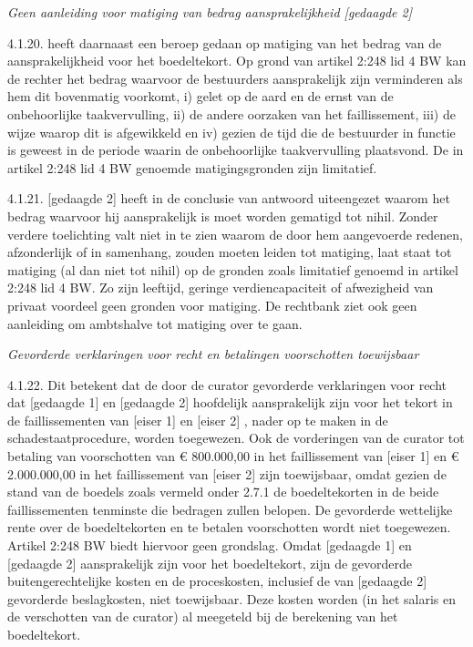 \documentclass[
  dutch,
  a4paper,
]{article}
\begin{document}
\emph{Geen aanleiding voor matiging van bedrag aansprakelijkheid {[}gedaagde 2{]}}

4.1.20. heeft daarnaast een beroep gedaan op matiging van het bedrag van de aansprakelijkheid voor het boedeltekort. Op grond van artikel 2:248 lid 4 BW kan de rechter het bedrag waarvoor de bestuurders aansprakelijk zijn verminderen als hem dit bovenmatig voorkomt, i) gelet op de aard en de ernst van de onbehoorlijke taakvervulling, ii) de andere oorzaken van het faillissement, iii) de wijze waarop dit is afgewikkeld en iv) gezien de tijd die de bestuurder in functie is geweest in de periode waarin de onbehoorlijke taakvervulling plaatsvond. De in artikel 2:248 lid 4 BW genoemde matigingsgronden zijn limitatief.

4.1.21. {[}gedaagde 2{]} heeft in de conclusie van antwoord uiteengezet waarom het bedrag waarvoor hij aansprakelijk is moet worden gematigd tot nihil. Zonder verdere toelichting valt niet in te zien waarom de door hem aangevoerde redenen, afzonderlijk of in samenhang, zouden moeten leiden tot matiging, laat staat tot matiging (al dan niet tot nihil) op de gronden zoals limitatief genoemd in artikel 2:248 lid 4 BW. Zo zijn leeftijd, geringe verdiencapaciteit of afwezigheid van privaat voordeel geen gronden voor matiging. De rechtbank ziet ook geen aanleiding om ambtshalve tot matiging over te gaan.

\emph{Gevorderde verklaringen voor recht en betalingen voorschotten toewijsbaar}

4.1.22. Dit betekent dat de door de curator gevorderde verklaringen voor recht dat {[}gedaagde 1{]} en {[}gedaagde 2{]} hoofdelijk aansprakelijk zijn voor het tekort in de faillissementen van {[}eiser 1{]} en {[}eiser 2{]} , nader op te maken in de schadestaatprocedure, worden toegewezen. Ook de vorderingen van de curator tot betaling van voorschotten van € 800.000,00 in het faillissement van {[}eiser 1{]} en € 2.000.000,00 in het faillissement van {[}eiser 2{]} zijn toewijsbaar, omdat gezien de stand van de boedels zoals vermeld onder 2.7.1 de boedeltekorten in de beide faillissementen tenminste die bedragen zullen belopen. De gevorderde wettelijke rente over de boedeltekorten en te betalen voorschotten wordt niet toegewezen. Artikel 2:248 BW biedt hiervoor geen grondslag. Omdat {[}gedaagde 1{]} en {[}gedaagde 2{]} aansprakelijk zijn voor het boedeltekort, zijn de gevorderde buitengerechtelijke kosten en de proceskosten, inclusief de van {[}gedaagde 2{]} gevorderde beslagkosten, niet toewijsbaar. Deze kosten worden (in het salaris en de verschotten van de curator) al meegeteld bij de berekening van het boedeltekort.
\end{document}
